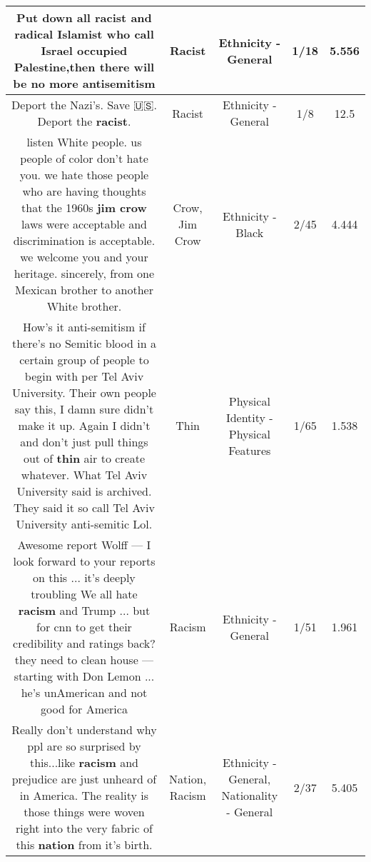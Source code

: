 \documentclass[11pt]{article}
\newlength\mylength
\begin{document}
\begin{center}
\begin{longtable}{|C{.65\mylength}|C{.30\mylength}|C{.12\mylength}|C{.12\mylength}|C{.12\mylength}|}
  \small Put down all \textbf{racist} and radical Islamist who call Israel occupied Palestine,then there will be no more antisemitism\normalsize   & Racist & Ethnicity - General & 1/18 & 5.556 \\  \hline
  \small Deport the Nazi's. Save 🇺🇸. Deport the \textbf{racist}.\normalsize   & Racist & Ethnicity - General & 1/8 & 12.5 \\  \hline
  \small listen White people. us people of color don't hate you. we hate those people who are having thoughts that the 1960s \textbf{jim c\textbf{row}} laws were acceptable and discrimination is acceptable. we welcome you and your heritage. sincerely, from one Mexican brother to another White brother.\normalsize   & Crow, Jim Crow & Ethnicity - Black & 2/45 & 4.444 \\  \hline
  \small How's it anti-semitism if there's no Semitic blood in a certain group of people to begin with per Tel Aviv University. Their own people say this, I damn sure didn't make it up. Again I didn't and don't just pull things out of \textbf{thin} air to create whatever. What Tel Aviv University said is archived. They said it so call Tel Aviv University anti-semitic Lol.\normalsize   & Thin & Physical Identity - Physical Features & 1/65 & 1.538 \\  \hline
  \small Awesome report Wolff — I look forward to your reports on this ... it's deeply troubling We all hate  \textbf{racism} and Trump ... but for cnn to get their credibility and ratings back? they need to clean house — starting with Don Lemon ... he's unAmerican and not good for America\normalsize   & Racism & Ethnicity - General & 1/51 & 1.961 \\  \hline
  \small Really don't understand why ppl are so surprised by this...like \textbf{racism} and prejudice are just unheard of in America. The reality is those things were woven right into the very fabric of this \textbf{nation} from it's birth.\normalsize   & Nation, Racism & Ethnicity - General, Nationality - General & 2/37 & 5.405 \\  \hline

\end{longtable}
\end{center}
\end{document}

